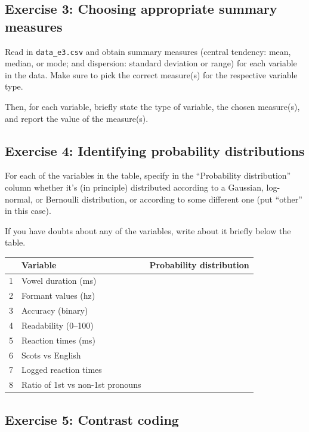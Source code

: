 \documentclass[
]{article}
\begin{document}
\hypertarget{exercise-3-choosing-appropriate-summary-measures}{%
\subsection{Exercise 3: Choosing appropriate summary
measures}\label{exercise-3-choosing-appropriate-summary-measures}}

Read in \texttt{data\_e3.csv} and obtain summary measures (central
tendency: mean, median, or mode; and dispersion: standard deviation or
range) for each variable in the data. Make sure to pick the correct
measure(s) for the respective variable type.

Then, for each variable, briefly state the type of variable, the chosen
measure(s), and report the value of the measure(s).

\hypertarget{exercise-4-identifying-probability-distributions}{%
\subsection{Exercise 4: Identifying probability
distributions}\label{exercise-4-identifying-probability-distributions}}

For each of the variables in the table, specify in the ``Probability
distribution'' column whether it's (in principle) distributed according
to a Gaussian, log-normal, or Bernoulli distribution, or according to
some different one (put ``other'' in this case).

If you have doubts about any of the variables, write about it briefly
below the table.

\begin{longtable}[]{@{}lll@{}}
\toprule()
& Variable & Probability distribution \\
\midrule()
\endhead
1 & Vowel duration (ms) & \\
2 & Formant values (hz) & \\
3 & Accuracy (binary) & \\
4 & Readability (0--100) & \\
5 & Reaction times (ms) & \\
6 & Scots vs English & \\
7 & Logged reaction times & \\
8 & Ratio of 1st vs non-1st pronouns & \\
\bottomrule()
\end{longtable}

\hypertarget{exercise-5-contrast-coding}{%
\subsection{Exercise 5: Contrast
coding}\label{exercise-5-contrast-coding}}
\end{document}
